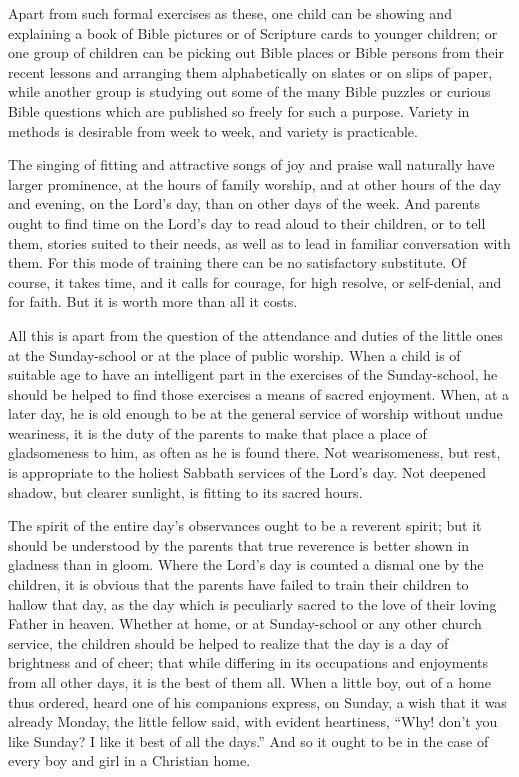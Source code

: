 \documentclass[
]{book}
\begin{document}
Apart from such formal exercises as these, one child can be showing and explaining a book of Bible pictures or of Scripture cards to younger children; or one group of children can be picking out Bible places or Bible persons from their recent lessons and arranging them alphabetically on slates or on slips of paper, while another group is studying out some of the many Bible puzzles or curious Bible questions which are published so freely for such a purpose. Variety in methods is desirable from week to week, and variety is practicable.

The singing of fitting and attractive songs of joy and praise wall naturally have larger prominence, at the hours of family worship, and at other hours of the day and evening, on the Lord's day, than on other days of the week. And parents ought to find time on the Lord's day to read aloud to their children, or to tell them, stories suited to their needs, as well as to lead in familiar conversation with them. For this mode of training there can be no satisfactory substitute. Of course, it takes time, and it calls for courage, for high resolve, or self-denial, and for faith. But it is worth more than all it costs.

All this is apart from the question of the attendance and duties of the little ones at the Sunday-school or at the place of public worship. When a child is of suitable age to have an intelligent part in the exercises of the Sunday-school, he should be helped to find those exercises a means of sacred enjoyment. When, at a later day, he is old enough to be at the general service of worship without undue weariness, it is the duty of the parents to make that place a place of gladsomeness to him, as often as he is found there. Not wearisomeness, but rest, is appropriate to the holiest Sabbath services of the Lord's day. Not deepened shadow, but clearer sunlight, is fitting to its sacred hours.

The spirit of the entire day's observances ought to be a reverent spirit; but it should be understood by the parents that true reverence is better shown in gladness than in gloom. Where the Lord's day is counted a dismal one by the children, it is obvious that the parents have failed to train their children to hallow that day, as the day which is peculiarly sacred to the love of their loving Father in heaven. Whether at home, or at Sunday-school or any other church service, the children should be helped to realize that the day is a day of brightness and of cheer; that while differing in its occupations and enjoyments from all other days, it is the best of them all. When a little boy, out of a home thus ordered, heard one of his companions express, on Sunday, a wish that it was already Monday, the little fellow said, with evident heartiness, ``Why! don't you like Sunday? I like it best of all the days.'' And so it ought to be in the case of every boy and girl in a Christian home.
\end{document}
